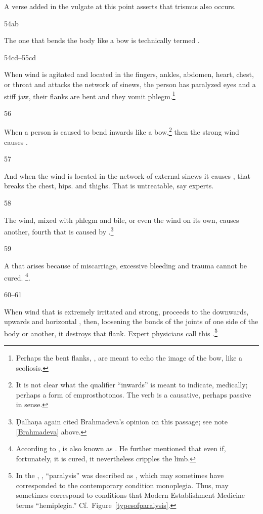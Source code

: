 \begin{translation}
{    A verse added in the vulgate at this point asserts that trismus also occurs.}
    
\item[54ab]

The one that bends the body like a bow is technically termed
. 

\item[54cd--55cd]

When wind is agitated and located in the fingers, ankles, abdomen, heart, chest, 
or throat and attacks the network of sinews, the person has paralyzed eyes and 
a stiff jaw, their flanks are bent and they vomit phlegm.\footnote{Perhaps 
    the bent flanks, , are meant to echo the image of the 
    bow, like a scoliosis.}

\item[56]

When a person is caused to bend inwards like a bow,\footnote{It is not
    clear what the qualifier “inwards” is meant to indicate, medically;
    perhaps a form of emprosthotonos.  The verb  is a
    causative, perhaps passive in sense.} then the strong wind causes
    .

\item[57]

And when the wind is located in the network of external sinews it
causes , that breaks the chest, hips.
and thighs. That is untreatable, say experts.

\item[58]

The wind, mixed with phlegm and bile, or even the wind on its own, causes  
another, fourth  that is caused by 
.\footnote{Ḍalhaṇa again cited Brahmadeva's opinion 
on this passage; see note \ref{Brahmadeva} above.}

\item[59]

A  that arises because of miscarriage,
excessive bleeding and trauma cannot be cured. \footnote{According to
    ,  is also known as
    . He further mentioned that even if, fortunately, it is
    cured, it nevertheless cripples the limb.}.

\item[60--61]

When wind that is extremely irritated and strong, proceeds to the
downwards, upwards and horizontal , then,
loosening the bonds of the joints of one side of the body or another,
it destroys that flank. Expert physicians call this
.\footnote{In the \CS, ,
     “paralysis” was described as , which may sometimes have corresponded to the
    contemporary condition monoplegia. Thus, 
    may sometimes correspond to conditions that Modern Establishment
    Medicine terms “hemiplegia.” Cf.\ Figure~\ref{typesofparalysis}.}


\end{translation}
